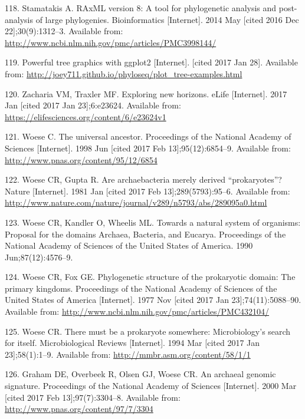 \documentclass[12pt,twoside]{reedthesis}
\begin{document}
  \hypertarget{ref-stamatakis_raxml_2014}{}
  118. Stamatakis A. RAxML version 8: A tool for phylogenetic analysis and
  post-analysis of large phylogenies. Bioinformatics {[}Internet{]}. 2014
  May {[}cited 2016 Dec 22{]};30(9):1312--3. Available from:
  \url{http://www.ncbi.nlm.nih.gov/pmc/articles/PMC3998144/}
  
  \hypertarget{ref-phyloseq_powerful_2016}{}
  119. Powerful tree graphics with ggplot2 {[}Internet{]}. {[}cited 2017
  Jan 28{]}. Available from:
  \url{http://joey711.github.io/phyloseq/plot_tree-examples.html}
  
  \hypertarget{ref-zacharia_exploring_2017}{}
  120. Zacharia VM, Traxler MF. Exploring new horizons. eLife
  {[}Internet{]}. 2017 Jan {[}cited 2017 Jan 23{]};6:e23624. Available
  from: \url{https://elifesciences.org/content/6/e23624v1}
  
  \hypertarget{ref-woese_universal_1998}{}
  121. Woese C. The universal ancestor. Proceedings of the National
  Academy of Sciences {[}Internet{]}. 1998 Jun {[}cited 2017 Feb
  13{]};95(12):6854--9. Available from:
  \url{http://www.pnas.org/content/95/12/6854}
  
  \hypertarget{ref-woese_are_1981}{}
  122. Woese CR, Gupta R. Are archaebacteria merely derived
  ``prokaryotes''? Nature {[}Internet{]}. 1981 Jan {[}cited 2017 Feb
  13{]};289(5793):95--6. Available from:
  \url{http://www.nature.com/nature/journal/v289/n5793/abs/289095a0.html}
  
  \hypertarget{ref-woese_towards_1990}{}
  123. Woese CR, Kandler O, Wheelis ML. Towards a natural system of
  organisms: Proposal for the domains Archaea, Bacteria, and Eucarya.
  Proceedings of the National Academy of Sciences of the United States of
  America. 1990 Jun;87(12):4576--9.
  
  \hypertarget{ref-woese_phylogenetic_1977}{}
  124. Woese CR, Fox GE. Phylogenetic structure of the prokaryotic domain:
  The primary kingdoms. Proceedings of the National Academy of Sciences of
  the United States of America {[}Internet{]}. 1977 Nov {[}cited 2017 Jan
  23{]};74(11):5088--90. Available from:
  \url{http://www.ncbi.nlm.nih.gov/pmc/articles/PMC432104/}
  
  \hypertarget{ref-woese_there_1994}{}
  125. Woese CR. There must be a prokaryote somewhere: Microbiology's
  search for itself. Microbiological Reviews {[}Internet{]}. 1994 Mar
  {[}cited 2017 Jan 23{]};58(1):1--9. Available from:
  \url{http://mmbr.asm.org/content/58/1/1}
  
  \hypertarget{ref-graham_archaeal_2000}{}
  126. Graham DE, Overbeek R, Olsen GJ, Woese CR. An archaeal genomic
  signature. Proceedings of the National Academy of Sciences
  {[}Internet{]}. 2000 Mar {[}cited 2017 Feb 13{]};97(7):3304--8.
  Available from: \url{http://www.pnas.org/content/97/7/3304}
  
\end{document}
